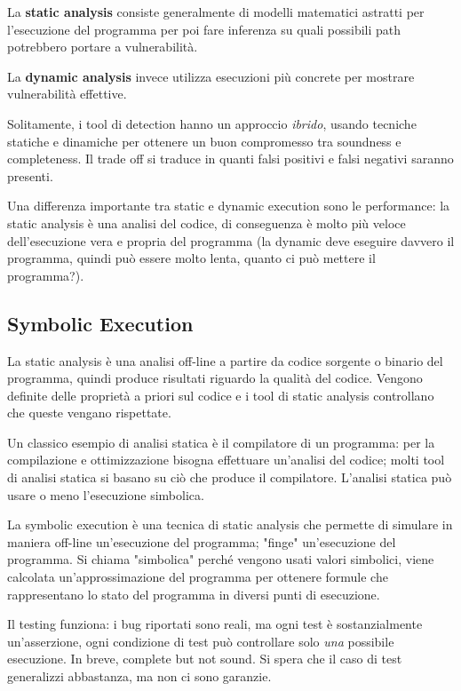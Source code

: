 La \textbf{static analysis} consiste generalmente di modelli matematici astratti per l'esecuzione del programma per poi fare inferenza su quali possibili path potrebbero portare a vulnerabilità. 

La \textbf{dynamic analysis} invece utilizza esecuzioni più concrete per mostrare vulnerabilità effettive. 

Solitamente, i tool di detection hanno un approccio \textit{ibrido}, usando tecniche statiche e dinamiche per ottenere un buon compromesso tra soundness e completeness. Il trade off si traduce in quanti falsi positivi e falsi negativi saranno presenti.

Una differenza importante tra static e dynamic execution sono le performance: la static analysis è una analisi del codice, di conseguenza è molto più veloce dell'esecuzione vera e propria del programma (la dynamic deve eseguire davvero il programma, quindi può essere molto lenta, quanto ci può mettere il programma?).

\subsection{Symbolic Execution}

La static analysis è una analisi off-line a partire da codice sorgente o binario del programma, quindi produce risultati riguardo la qualità del codice. Vengono definite delle proprietà a priori sul codice e i tool di static analysis controllano che queste vengano rispettate. 

Un classico esempio di analisi statica è il compilatore di un programma: per la compilazione e ottimizzazione bisogna effettuare un'analisi del codice; molti tool di analisi statica si basano su ciò che produce il compilatore. L'analisi statica può usare o meno l'esecuzione simbolica.

La symbolic execution è una tecnica di static analysis che permette di simulare in maniera off-line un'esecuzione del programma; "finge" un'esecuzione del programma. Si chiama "simbolica" perché vengono usati valori simbolici, viene calcolata un'approssimazione del programma per ottenere formule che rappresentano lo stato del programma in diversi punti di esecuzione. 

Il testing funziona: i bug riportati sono reali, ma ogni test è sostanzialmente un'asserzione, ogni condizione di test può controllare solo \textit{una} possibile esecuzione. In breve, complete but not sound. Si spera che il caso di test generalizzi abbastanza, ma non ci sono garanzie.

